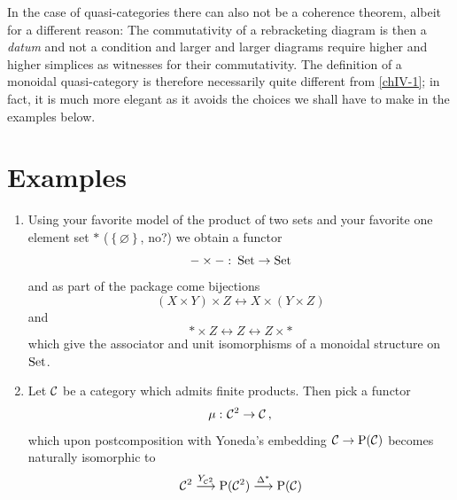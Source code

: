        In the case of quasi-categories there can also not be a coherence theorem, albeit for a different reason: The commutativity of a rebracketing diagram is then a \emph{datum} and not a condition and larger and larger diagrams require higher and higher simplices as witnesses for their commutativity. The definition of a monoidal quasi-category is therefore necessarily quite different from \ref{chIV-1}; in fact, it is much more elegant as it avoids the choices we shall have to make in the examples below.

    \section{Examples}
        \begin{enumerate}[label=\roman*)]
            \item 
                Using your favorite model of the product of two sets and your favorite one element set $*$ ($\left\{ \varnothing \right\}$, no?) we obtain a functor
                \begin{equation*}
                    - \times - \,\colon \operatorname{Set} \to \operatorname{Set}
                \end{equation*}
                and as part of the package come bijections
                \begin{equation*}
                    (X \times Y) \times Z \longleftrightarrow X \times (Y \times Z)
                \end{equation*}
                and
                \begin{equation*}
                    * \times Z \longleftrightarrow Z \longleftrightarrow Z \times *
                \end{equation*}
                which give the associator and unit isomorphisms of a monoidal structure on $\operatorname{Set}$.
            \item 
                Let $\mathcal{C}$ be a category which admits finite products. Then pick a functor
                \begin{equation*}
                    \mu \,\colon \mathcal{C}^2 \to \mathcal{C} \,,
                \end{equation*}
                which upon postcomposition with Yoneda's embedding $\mathcal{C} \to \mathrm{P}(\mathcal{C})$ becomes naturally isomorphic to
                \begin{equation*}
                    \mathcal{C}^2 \overset{Y_{\mathcal{C}^2}}{\longrightarrow} \mathrm{P}(\mathcal{C}^2) \overset{\Delta^*}{\longrightarrow} \mathrm{P}(\mathcal{C})
                \end{equation*}

\end{enumerate}
